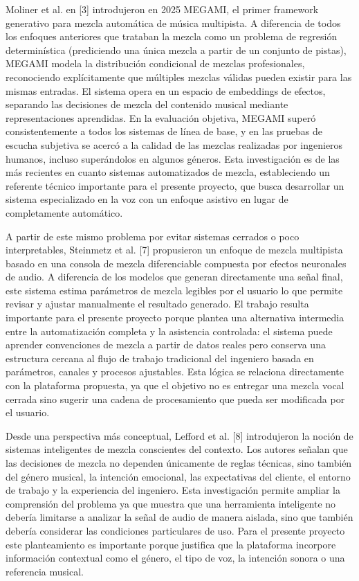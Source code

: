 Moliner et al. en [3] introdujeron en 2025 MEGAMI, el primer framework generativo para mezcla automática de música multipista. A diferencia de todos los enfoques anteriores que trataban la mezcla como un problema de regresión determinística (prediciendo una única mezcla a partir de un conjunto de pistas), MEGAMI modela la distribución condicional de mezclas profesionales, reconociendo explícitamente que múltiples mezclas válidas pueden existir para las mismas entradas. El sistema opera en un espacio de embeddings de efectos, separando las decisiones de mezcla del contenido musical mediante representaciones aprendidas. En la evaluación objetiva, MEGAMI superó consistentemente a todos los sistemas de línea de base, y en las pruebas de escucha subjetiva se acercó a la calidad de las mezclas realizadas por ingenieros humanos, incluso superándolos en algunos géneros. Esta investigación es de las más recientes en cuanto sistemas automatizados de mezcla, estableciendo un referente técnico importante para el presente proyecto, que busca desarrollar un sistema especializado en la voz con un enfoque asistivo en lugar de completamente automático.

A partir de este mismo problema por evitar sistemas cerrados o poco interpretables, Steinmetz et al. [7] propusieron un enfoque de mezcla multipista basado en una consola de mezcla diferenciable compuesta por efectos neuronales de audio. A diferencia de los modelos que generan directamente una señal final, este sistema estima parámetros de mezcla legibles por el usuario lo que permite revisar y ajustar manualmente el resultado generado. El trabajo resulta importante para el presente proyecto porque plantea una alternativa intermedia entre la automatización completa y la asistencia controlada: el sistema puede aprender convenciones de mezcla a partir de datos reales pero conserva una estructura cercana al flujo de trabajo tradicional del ingeniero basada en parámetros, canales y procesos ajustables. Esta lógica se relaciona directamente con la plataforma propuesta, ya que el objetivo no es entregar una mezcla vocal cerrada sino sugerir una cadena de procesamiento que pueda ser modificada por el usuario.

Desde una perspectiva más conceptual, Lefford et al. [8] introdujeron la noción de sistemas inteligentes de mezcla conscientes del contexto. Los autores señalan que las decisiones de mezcla no dependen únicamente de reglas técnicas, sino también del género musical, la intención emocional, las expectativas del cliente, el entorno de trabajo y la experiencia del ingeniero. Esta investigación permite ampliar la comprensión del problema ya que muestra que una herramienta inteligente no debería limitarse a analizar la señal de audio de manera aislada, sino que también debería considerar las condiciones particulares de uso. Para el presente proyecto este planteamiento es importante porque justifica que la plataforma incorpore información contextual como el género, el tipo de voz, la intención sonora o una referencia musical.

